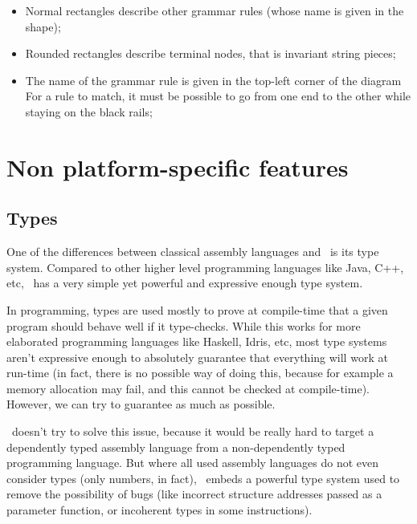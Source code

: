 \begin{itemize}
\begin{figure}[H]
		      \centering
	      \end{figure}
	      \begin{itemize}
		      \item Normal rectangles describe other grammar rules (whose name is given in the shape);
		      \item Rounded rectangles describe terminal nodes, that is invariant string pieces;
		      \item The name of the grammar rule is given in the top-left corner of the diagram
		            For a rule to match, it must be possible to go from one end to the other while staying on the black rails;
	      \end{itemize}
\end{itemize}

\chapter{Non platform-specific features}\label{chap:nstar-common}

\section{Types}\label{sec:nstar-common-ts}

One of the differences between classical assembly languages and \nstar\ is its type system.
Compared to other higher level programming languages like Java, C++, etc, \nstar\ has a very simple yet powerful and expressive enough type system.

In programming, types are used mostly to prove at compile-time that a given program should behave well if it type-checks. While this works for more elaborated programming languages like Haskell, Idris, etc, most type systems aren't expressive enough to absolutely guarantee that everything will work at run-time (in fact, there is no possible way of doing this, because for example a memory allocation may fail, and this cannot be checked at compile-time). However, we can try to guarantee as much as possible.

\nstar\ doesn't try to solve this issue, because it would be really hard to target a dependently typed assembly language from a non-dependently typed programming language. But where all used assembly languages do not even consider types (only numbers, in fact), \nstar\ embeds a powerful type system used to remove the possibility of bugs (like incorrect structure addresses passed as a parameter function, or incoherent types in some instructions).

